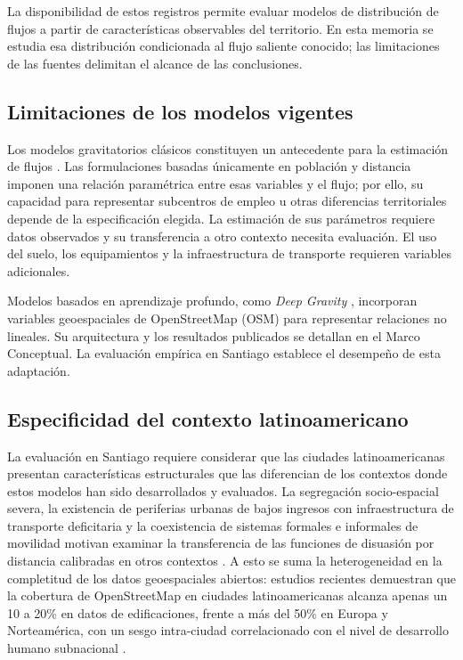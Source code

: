 La disponibilidad de estos registros permite evaluar modelos de distribución de flujos a partir de características observables del territorio. En esta memoria se estudia esa distribución condicionada al flujo saliente conocido; las limitaciones de las fuentes delimitan el alcance de las conclusiones.

\subsection{Limitaciones de los modelos vigentes}

Los modelos gravitatorios clásicos constituyen un antecedente para la estimación de flujos \cite{simini2012universal,liu2024interdisciplinary}. Las formulaciones basadas únicamente en población y distancia imponen una relación paramétrica entre esas variables y el flujo; por ello, su capacidad para representar subcentros de empleo u otras diferencias territoriales depende de la especificación elegida. La estimación de sus parámetros requiere datos observados y su transferencia a otro contexto necesita evaluación. El uso del suelo, los equipamientos y la infraestructura de transporte requieren variables adicionales.

Modelos basados en aprendizaje profundo, como \textit{Deep Gravity} \cite{simini2021deep}, incorporan variables geoespaciales de OpenStreetMap (OSM) para representar relaciones no lineales. Su arquitectura y los resultados publicados se detallan en el Marco Conceptual. La evaluación empírica en Santiago establece el desempeño de esta adaptación.

\subsection{Especificidad del contexto latinoamericano}

La evaluación en Santiago requiere considerar que las ciudades latinoamericanas presentan características estructurales que las diferencian de los contextos donde estos modelos han sido desarrollados y evaluados. La segregación socio-espacial severa, la existencia de periferias urbanas de bajos ingresos con infraestructura de transporte deficitaria y la coexistencia de sistemas formales e informales de movilidad motivan examinar la transferencia de las funciones de disuasión por distancia calibradas en otros contextos \cite{vecchio2020transport}. A esto se suma la heterogeneidad en la completitud de los datos geoespaciales abiertos: estudios recientes demuestran que la cobertura de OpenStreetMap en ciudades latinoamericanas alcanza apenas un 10 a 20\% en datos de edificaciones, frente a más del 50\% en Europa y Norteamérica, con un sesgo intra-ciudad correlacionado con el nivel de desarrollo humano subnacional \cite{herfort2023spatio, BarringtonLeigh2017}.

